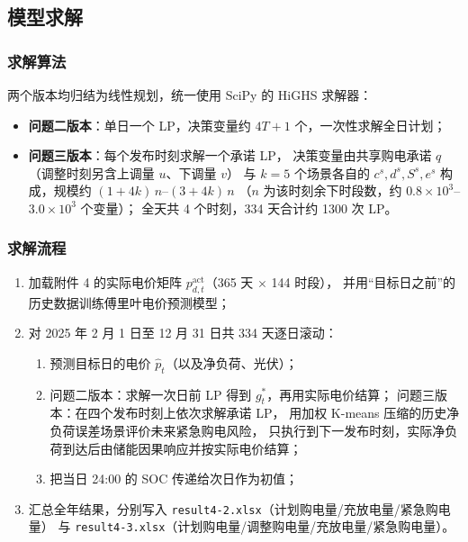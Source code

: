 \documentclass[12pt,a4paper]{article}
\begin{document}
\subsection{模型求解}

\subsubsection{求解算法}

两个版本均归结为线性规划，统一使用 SciPy 的 HiGHS 求解器：

\begin{itemize}
    \item \textbf{问题二版本}：单日一个 LP，决策变量约 ${4T+1}$ 个，一次性求解全日计划；
    \item \textbf{问题三版本}：每个发布时刻求解一个承诺 LP，
          决策变量由共享购电承诺 $q$（调整时刻另含上调量 $u$、下调量 $v$）
          与 $k=5$ 个场景各自的 $c^s, d^s, S^s, e^s$ 构成，规模约 $(1+4k)\,n$--$(3+4k)\,n$
          （$n$ 为该时刻余下时段数，约 $0.8\times10^3$--$3.0\times10^3$ 个变量）；
          全天共 4 个时刻，334 天合计约 1300 次 LP。
\end{itemize}

\subsubsection{求解流程}

\begin{enumerate}
    \item 加载附件 4 的实际电价矩阵 $p^{\text{act}}_{d,t}$（365 天 $\times$ 144 时段），
          并用“目标日之前”的历史数据训练傅里叶电价预测模型；
    \item 对 2025 年 2 月 1 日至 12 月 31 日共 334 天逐日滚动：
    \begin{enumerate}
        \item 预测目标日的电价 $\hat{p}_t$（以及净负荷、光伏）；
        \item 问题二版本：求解一次日前 LP 得到 $g_t^*$，再用实际电价结算；
              问题三版本：在四个发布时刻上依次求解承诺 LP，
                    用加权 K-means 压缩的历史净负荷误差场景评价未来紧急购电风险，
                    只执行到下一发布时刻，实际净负荷到达后由储能因果响应并按实际电价结算；
        \item 把当日 24:00 的 SOC 传递给次日作为初值；
    \end{enumerate}
    \item 汇总全年结果，分别写入 \texttt{result4-2.xlsx}（计划购电量/充放电量/紧急购电量）
          与 \texttt{result4-3.xlsx}（计划购电量/调整购电量/充放电量/紧急购电量）。
\end{enumerate}
\end{document}
